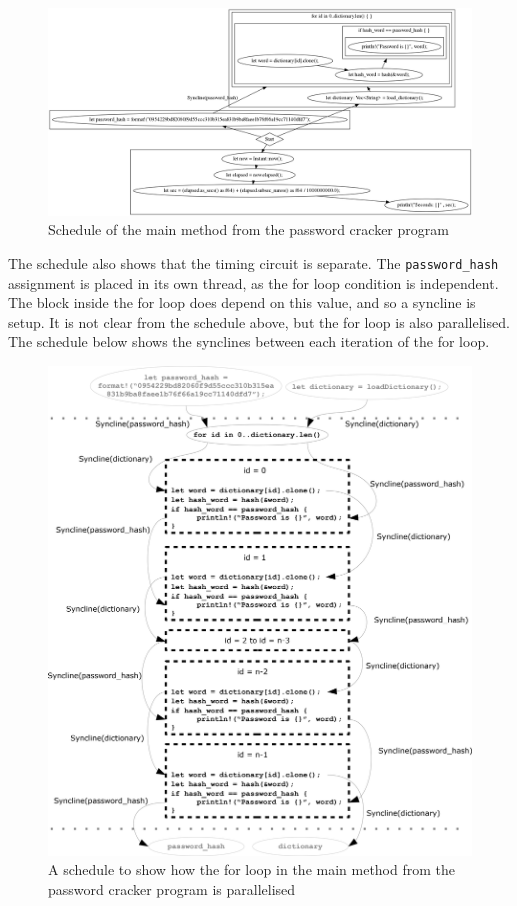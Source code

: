 \begin{figure}[H]
    \centering
    \includegraphics[width=\textwidth]{img/password-cracker/main-schedule.png}
    \caption{Schedule of the main method from the password cracker program}
\end{figure}

The schedule also shows that the timing circuit is separate. The \texttt{password\_hash} assignment is placed in its own thread, as the for loop condition is independent. The block inside the for loop does depend on this value, and so a syncline is setup. It is not clear from the schedule above, but the for loop is also parallelised. The schedule below shows the synclines between each iteration of the for loop.

\begin{figure}[H]
    \centering
    \includegraphics[width=\textwidth]{img/password-cracker/parallel-for.png}
    \caption{A schedule to show how the for loop in the main method from the password cracker program is parallelised}
\end{figure}


